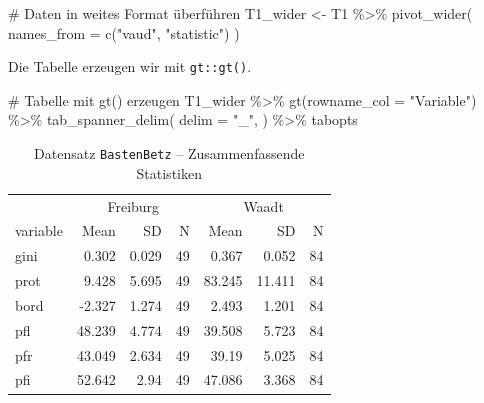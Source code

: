 \documentclass[
  a4paper,
  DIV=11,
  oneside]{scrreprt}
\newenvironment{Shaded}{\begin{snugshade}}{\end{snugshade}}
\newcommand{\AttributeTok}[1]{\textcolor[rgb]{0.40,0.45,0.13}{#1}}
\newcommand{\CommentTok}[1]{\textcolor[rgb]{0.37,0.37,0.37}{#1}}
\newcommand{\FunctionTok}[1]{\textcolor[rgb]{0.28,0.35,0.67}{#1}}
\newcommand{\NormalTok}[1]{\textcolor[rgb]{0.00,0.23,0.31}{#1}}
\newcommand{\OtherTok}[1]{\textcolor[rgb]{0.00,0.23,0.31}{#1}}
\newcommand{\SpecialCharTok}[1]{\textcolor[rgb]{0.37,0.37,0.37}{#1}}
\newcommand{\StringTok}[1]{\textcolor[rgb]{0.13,0.47,0.30}{#1}}
\begin{document}
\begin{Shaded}
\begin{Highlighting}[]
\CommentTok{\# Daten in weites Format überführen}
\NormalTok{T1\_wider }\OtherTok{\textless{}{-}}\NormalTok{ T1 }\SpecialCharTok{\%\textgreater{}\%} 
  \FunctionTok{pivot\_wider}\NormalTok{(}
    \AttributeTok{names\_from =} \FunctionTok{c}\NormalTok{(}\StringTok{"vaud"}\NormalTok{, }\StringTok{"statistic"}\NormalTok{)}
\NormalTok{  )}
\end{Highlighting}
\end{Shaded}

Die Tabelle erzeugen wir mit \texttt{gt::gt()}.

\begin{Shaded}
\begin{Highlighting}[]
\CommentTok{\# Tabelle mit gt() erzeugen}
\NormalTok{T1\_wider }\SpecialCharTok{\%\textgreater{}\%}
  \FunctionTok{gt}\NormalTok{(}\AttributeTok{rowname\_col =} \StringTok{"Variable"}\NormalTok{) }\SpecialCharTok{\%\textgreater{}\%} 
  \FunctionTok{tab\_spanner\_delim}\NormalTok{(}
    \AttributeTok{delim =} \StringTok{"\_"}\NormalTok{,}
\NormalTok{  ) }\SpecialCharTok{\%\textgreater{}\%}
\NormalTok{ tabopts}
\end{Highlighting}
\end{Shaded}

\begingroup
\fontsize{12.0pt}{14.4pt}\selectfont

\begin{longtable}{lrrrrrr}

\caption{\label{tbl-sumstat}Datensatz \texttt{BastenBetz} --
Zusammenfassende Statistiken}

\tabularnewline

\toprule
 & \multicolumn{3}{c}{Freiburg} & \multicolumn{3}{c}{Waadt} \\ 
\cmidrule(lr){2-4} \cmidrule(lr){5-7}
variable & Mean & SD & N & Mean & SD & N \\ 
\midrule\addlinespace[2.5pt]
gini & 0.302 & 0.029 & 49 & 0.367 & 0.052 & 84 \\ 
prot & 9.428 & 5.695 & 49 & 83.245 & 11.411 & 84 \\ 
bord & -2.327 & 1.274 & 49 & 2.493 & 1.201 & 84 \\ 
pfl & 48.239 & 4.774 & 49 & 39.508 & 5.723 & 84 \\ 
pfr & 43.049 & 2.634 & 49 & 39.19 & 5.025 & 84 \\ 
pfi & 52.642 & 2.94 & 49 & 47.086 & 3.368 & 84 \\ 
\bottomrule

\end{longtable}
\end{document}
